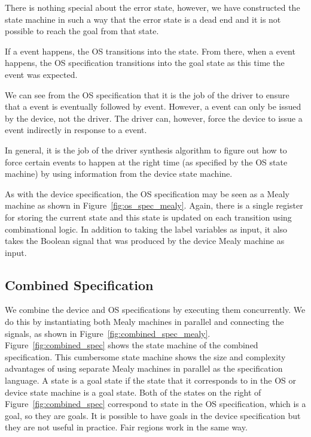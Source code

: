 There is nothing special about the error state, however, we have constructed the state machine in such a way that the error state is a dead end and it is not possible to reach the goal from that state.

If a  event happens, the OS transitions into the  state. From there, when a  event happens, the OS specification transitions into the goal state as this time the  event was expected. 

We can see from the OS specification that it is the job of the driver to ensure that a  event is eventually followed by  event. However, a  event can only be issued by the device, not the driver. The driver can, however, force the device to issue a  event indirectly in response to a  event. 

In general, it is the job of the driver synthesis algorithm to figure out how to force certain events to happen at the right time (as specified by the OS state machine) by using information from the device state machine. 

As with the device specification, the OS specification may be seen as a Mealy machine as shown in Figure~\ref{fig:os_spec_mealy}. Again, there is a single register for storing the current state and this state is updated on each transition using combinational logic. In addition to taking the label variables as input, it also takes the  Boolean signal that was produced by the device Mealy machine as input. 

\subsection{Combined Specification}

We combine the device and OS specifications by executing them concurrently. We do this by instantiating both Mealy machines in parallel and connecting the signals, as shown in Figure~\ref{fig:combined_spec_mealy}. Figure~\ref{fig:combined_spec} shows the state machine of the combined specification. This cumbersome state machine shows the size and complexity advantages of using separate Mealy machines in parallel as the specification language. A state is a goal state if the state that it corresponds to in the OS or device state machine is a goal state. Both of the states on the right of Figure~\ref{fig:combined_spec} correspond to state  in the OS specification, which is a goal, so they are goals. It is possible to have goals in the device specification but they are not useful in practice. Fair regions work in the same way.

